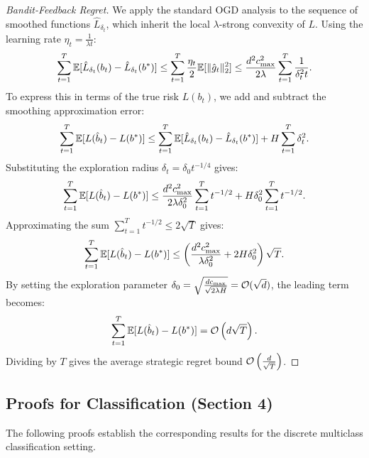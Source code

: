 \begin{proof}[Bandit-Feedback Regret]
We apply the standard OGD analysis to the sequence of smoothed functions $\hat{L}_{\delta_t}$, which inherit the local $\lambda$-strong convexity of $L$. Using the learning rate $\eta_t = \frac{1}{\lambda t}$:
\begin{equation}
    \sum_{t=1}^T \mathbb{E}[\hat{L}_{\delta_t}(b_t) - \hat{L}_{\delta_t}(b^*)] \le \sum_{t=1}^T \frac{\eta_t}{2}\mathbb{E}[\|\hat{g}_t\|_2^2] \le \frac{d^2 c_{\max}^2}{2\lambda}\sum_{t=1}^T \frac{1}{\delta_t^2 t}.
\end{equation}
To express this in terms of the true risk $L(b_t)$, we add and subtract the smoothing approximation error:
\begin{equation}
    \sum_{t=1}^T \mathbb{E}[L(\hat{b}_t) - L(b^*)] \le \sum_{t=1}^T \mathbb{E}[\hat{L}_{\delta_t}(b_t) - \hat{L}_{\delta_t}(b^*)] + H\sum_{t=1}^T \delta_t^2.
\end{equation}
Substituting the exploration radius $\delta_t = \delta_0 t^{-1/4}$ gives:
\begin{equation}
    \sum_{t=1}^T \mathbb{E}[L(\hat{b}_t) - L(b^*)] \le \frac{d^2 c_{\max}^2}{2\lambda \delta_0^2}\sum_{t=1}^T t^{-1/2} + H\delta_0^2 \sum_{t=1}^T t^{-1/2}.
\end{equation}
Approximating the sum $\sum_{t=1}^T t^{-1/2} \le 2\sqrt{T}$ gives:
\begin{equation}
    \sum_{t=1}^T \mathbb{E}[L(\hat{b}_t) - L(b^*)] \le \left( \frac{d^2 c_{\max}^2}{\lambda \delta_0^2} + 2H\delta_0^2 \right) \sqrt{T}.
\end{equation}
By setting the exploration parameter $\delta_0 = \sqrt{\frac{d c_{\max}}{\sqrt{2\lambda H}}} = \mathcal{O}(\sqrt{d})$, the leading term becomes:
\begin{equation}
    \sum_{t=1}^T \mathbb{E}[L(\hat{b}_t) - L(b^*)] = \mathcal{O}\left( d \sqrt{T} \right).
\end{equation}
Dividing by $T$ gives the average strategic regret bound $\mathcal{O}\left( \frac{d}{\sqrt{T}} \right)$.
\end{proof}


\subsection{Proofs for Classification (Section 4)}
\label{subsec:proofs_classification}

The following proofs establish the corresponding results for the discrete multiclass classification setting.


